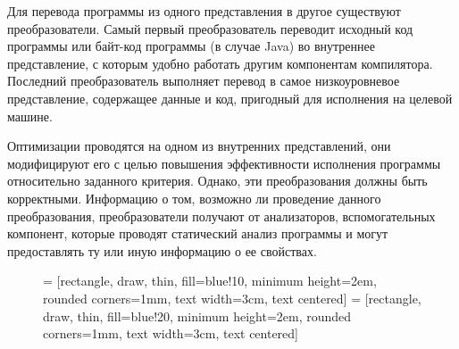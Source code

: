 \documentclass[14pt,titlepage]{extarticle}
\begin{document}
      Для перевода программы из одного представления в другое существуют
      преобразователи.
      Самый первый преобразователь переводит исходный код программы
      или байт-код программы (в случае Java)
      во внутреннее представление, с которым удобно работать другим
      компонентам компилятора.
      Последний преобразователь выполняет перевод в самое низкоуровневое
      представление, содержащее данные и код, пригодный для исполнения
      на целевой машине.

      Оптимизации проводятся на одном из внутренних представлений, они
      модифицируют его с целью повышения эффективности исполнения программы
      относительно заданного критерия. Однако, эти преобразования должны быть
      корректными. Информацию о том, возможно ли проведение данного
      преобразования, преобразователи получают от анализаторов, вспомогательных
      компонент, которые проводят статический анализ программы и могут
      предоставлять ту или иную информацию о ее свойствах.

      \begin{figure}[!htb]
        \centering

         = [rectangle, draw, thin, fill=blue!10,
                            minimum height=2em, rounded corners=1mm,
                            text width=3cm, text centered]
         =  [rectangle, draw, thin, fill=blue!20,
                            minimum height=2em, rounded corners=1mm,
                            text width=3cm, text centered]

      \end{figure}
\end{document}
